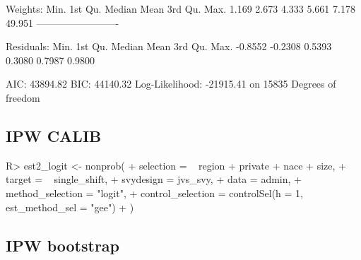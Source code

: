 \documentclass[
]{jss}
\begin{document}
\begin{CodeChunk}
\begin{CodeOutput}
Weights:
   Min. 1st Qu.  Median    Mean 3rd Qu.    Max. 
  1.169   2.673   4.333   5.661   7.178  49.951 
-------------------------

Residuals:
   Min. 1st Qu.  Median    Mean 3rd Qu.    Max. 
-0.8552 -0.2308  0.5393  0.3080  0.7987  0.9800 

AIC: 43894.82
BIC: 44140.32
Log-Likelihood: -21915.41 on 15835 Degrees of freedom
\end{CodeOutput}
\end{CodeChunk}

\hypertarget{ipw-calib}{%
\subsection{IPW CALIB}\label{ipw-calib}}

\begin{CodeChunk}
\begin{CodeInput}
R> est2_logit <- nonprob(
+   selection = ~ region + private + nace + size,
+   target = ~ single_shift,
+   svydesign = jvs_svy,
+   data = admin,
+   method_selection = "logit",
+   control_selection = controlSel(h = 1, est_method_sel = "gee")
+ )
\end{CodeInput}
\end{CodeChunk}

\hypertarget{ipw-bootstrap}{%
\subsection{IPW bootstrap}\label{ipw-bootstrap}}
\end{document}
